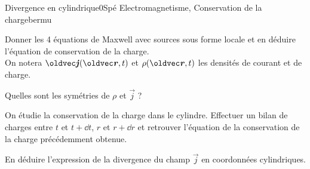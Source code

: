 \begin{exercise}{Divergence en cylindrique}{0}{Spé}
{Electromagnetisme, Conservation de la charge}{bermu}

\begin{questions}
    \questioncours Donner les 4 équations de Maxwell avec sources sous forme locale et en déduire l'équation de conservation de la charge. \\
    On notera $\vec{j}(\vr,t)$ et $\rho(\vr,t)$ les densités de courant et de charge.
    
    
    
    \question Quelles sont les symétries de $\rho$ et $\vec{j}$ ?
    
    \question On étudie la conservation de la charge dans le cylindre. Effectuer un bilan de charges entre $t$ et $t + \dd{t}$, $r$ et $r + \dd{r}$ et retrouver l'équation de la conservation de la charge précédemment obtenue.

    \question En déduire l'expression de la divergence du champ $\vec{j}$ en coordonnées cylindriques.

\end{questions}

\end{exercise}
